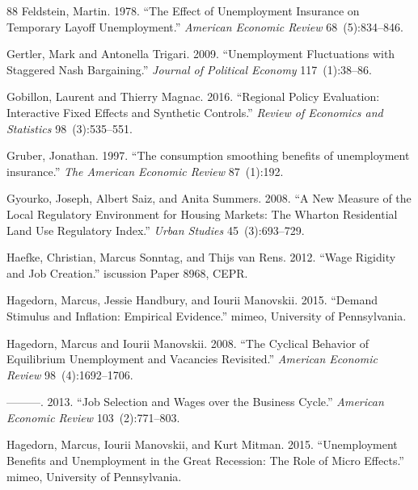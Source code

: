 \documentclass[12pt]{article}
\newcommand{\1}{\mathbf{1}}
\begin{document}
\begin{thebibliography}{88}
Feldstein, Martin. 1978.
\newblock \enquote{The Effect of Unemployment Insurance on Temporary Layoff Unemployment.}
\newblock \emph{American Economic Review} 68~(5):834--846.

Gertler, Mark and Antonella Trigari. 2009.
\newblock \enquote{Unemployment Fluctuations with Staggered Nash Bargaining.}
\newblock \emph{Journal of Political Economy} 117~(1):38--86.

Gobillon, Laurent and Thierry Magnac. 2016.
\newblock \enquote{Regional Policy Evaluation: Interactive Fixed Effects and Synthetic Controls.}
\newblock \emph{Review of Economics and Statistics} 98~(3):535--551.

Gruber, Jonathan. 1997.
\newblock \enquote{The consumption smoothing benefits of unemployment insurance.}
\newblock \emph{The American Economic Review} 87~(1):192.

Gyourko, Joseph, Albert Saiz, and Anita Summers. 2008.
\newblock \enquote{A New Measure of the Local Regulatory Environment for Housing Markets: The Wharton Residential Land Use Regulatory Index.}
\newblock \emph{Urban Studies} 45~(3):693--729.

Haefke, Christian, Marcus Sonntag, and Thijs van Rens. 2012.
\newblock \enquote{Wage Rigidity and Job Creation.}
iscussion {Paper} 8968, {CEPR}.

Hagedorn, Marcus, Jessie Handbury, and Iourii Manovskii. 2015.
\newblock \enquote{Demand Stimulus and Inflation: Empirical Evidence.}
\newblock mimeo, University of Pennsylvania.

Hagedorn, Marcus and Iourii Manovskii. 2008.
\newblock \enquote{The Cyclical Behavior of Equilibrium Unemployment and Vacancies Revisited.}
\newblock \emph{American Economic Review} 98~(4):1692--1706.

---{}---{}---. 2013.
\newblock \enquote{Job Selection and Wages over the Business Cycle.}
\newblock \emph{American Economic Review} 103~(2):771--803.

Hagedorn, Marcus, Iourii Manovskii, and Kurt Mitman. 2015.
\newblock \enquote{Unemployment Benefits and Unemployment in the Great Recession: The Role of Micro Effects.}
\newblock mimeo, University of Pennsylvania.


\end{thebibliography}
\end{document}
